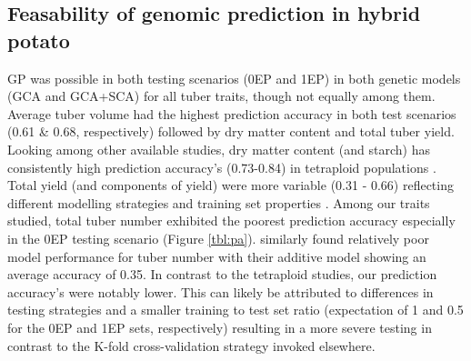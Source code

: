 \subsection{Feasability of genomic prediction in hybrid potato}

GP was possible in both testing scenarios (0EP and 1EP) in both genetic models (GCA and GCA+SCA) for all tuber traits, though not equally among them. Average tuber volume had the highest prediction accuracy in both test scenarios (0.61 \& 0.68, respectively) followed by dry matter content and total tuber yield. Looking among other available studies, dry matter content (and starch) has consistently high prediction accuracy's (0.73-0.84) in tetraploid populations \parencite{Sverrisdottir2018, Cuevas2022, Ortiz2022}. Total yield (and components of yield) were more variable (0.31 - 0.66) reflecting different modelling strategies and training set properties . Among our traits studied, total tuber number exhibited the poorest prediction accuracy especially in the 0EP testing scenario (Figure \ref{tbl:pa}).  similarly found relatively poor model performance for tuber number with their additive model showing an average accuracy of 0.35. In contrast to the tetraploid studies, our prediction accuracy's were notably lower. This can likely be attributed to differences in testing strategies and a smaller training to test set ratio (expectation of 1 and 0.5 for the 0EP and 1EP sets, respectively) resulting in a more severe testing in contrast to the K-fold cross-validation strategy invoked elsewhere.

